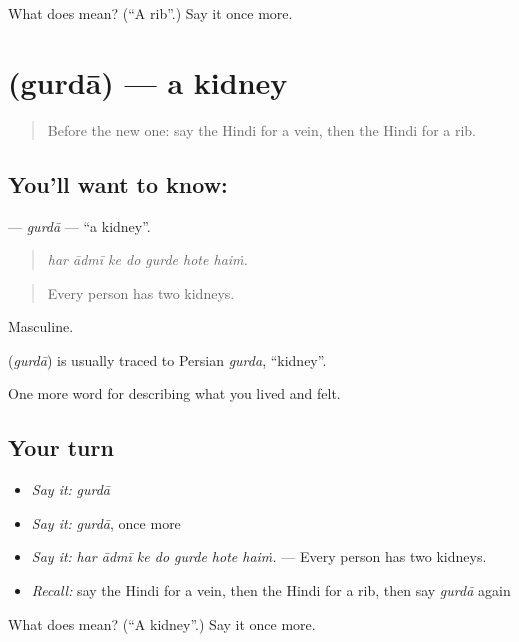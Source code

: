 \begin{tcolorbox}[breakable,colback=teal!4,colframe=teal!35!black,title={Before you move on}]
What does  mean? (\textquotedblleft{}A rib\textquotedblright{}.) Say it once more.
\end{tcolorbox}
\section[\texorpdfstring{\hi{गुर्दा} (gurdā)}{गुर्दा (gurdā)}]{ (gurdā) — a kidney}

\label{lesson:HI-C478-gurda}



\begin{quote}
Before the new one: say the Hindi for a vein, then the Hindi for a rib.
\end{quote}

\subsection*{You'll want to know: }
\textbf{} — \emph{gurdā} — \textquotedblleft{}a kidney\textquotedblright{}.

\begin{quote}
      
\end{quote}

\begin{quote}
\emph{har ādmī ke do gurde hote haiṁ.}
\end{quote}

\begin{quote}
Every person has two kidneys.
\end{quote}

Masculine.

\begin{cousinweb}
\textbf{} (\emph{gurdā}) is usually traced to Persian \emph{gurda}, \textquotedblleft{}kidney\textquotedblright{}.
\end{cousinweb}

\begin{grammarlens}[title={What you've built}]
One more word for describing what you lived and felt.
\end{grammarlens}

\subsection*{Your turn}
\begin{itemize}
\raggedright
  \item \emph{Say it:} \emph{gurdā}
  \item \emph{Say it:} \emph{gurdā}, once more
  \item \emph{Say it:} \emph{har ādmī ke do gurde hote haiṁ.} — Every person has two kidneys.
  \item \emph{Recall:} say the Hindi for a vein, then the Hindi for a rib, then say \emph{gurdā} again
\end{itemize}

\begin{tcolorbox}[breakable,colback=teal!4,colframe=teal!35!black,title={Before you move on}]
What does  mean? (\textquotedblleft{}A kidney\textquotedblright{}.) Say it once more.
\end{tcolorbox}
